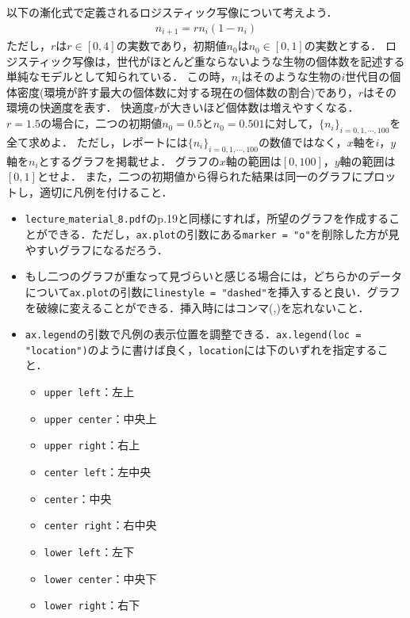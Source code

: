 \documentclass[a4paper,12pt]{jsarticle}
\begin{document}
以下の漸化式で定義されるロジスティック写像について考えよう．
\begin{align}
\label{eq:logistic}
    n_{i+1}=rn_{i}(1-n_{i})    
\end{align}
ただし，$r$は$r\in[0,4]$の実数であり，初期値$n_{0}$は$n_{0}\in[0,1]$の実数とする．
ロジスティック写像は，世代がほとんど重ならないような生物の個体数を記述する単純なモデルとして知られている．
この時，$n_{i}$はそのような生物の$i$世代目の個体密度(環境が許す最大の個体数に対する現在の個体数の割合)であり，$r$はその環境の快適度を表す．
快適度$r$が大きいほど個体数は増えやすくなる．\\

$r=1.5$の場合に，二つの初期値$n_{0}=0.5$と$n_{0}=0.501$に対して，$\{n_{i}\}_{i=0,1,\cdots,100}$を全て求めよ．
ただし，レポートには$\{n_{i}\}_{i=0,1,\cdots,100}$の数値ではなく，$x$軸を$i$，$y$軸を$n_{i}$とするグラフを掲載せよ．
グラフの$x$軸の範囲は$[0,100]$，$y$軸の範囲は$[0,1]$とせよ．
また，二つの初期値から得られた結果は同一のグラフにプロットし，適切に凡例を付けること．
\\

\begin{itemize}
    \item \texttt{lecture$\_$material$\_$8.pdf}のp.19と同様にすれば，所望のグラフを作成することができる．ただし，\texttt{ax.plot}の引数にある\texttt{marker = "o"}を削除した方が見やすいグラフになるだろう．
    \item もし二つのグラフが重なって見づらいと感じる場合には，どちらかのデータについて\texttt{ax.plot}の引数に\texttt{linestyle = "dashed"}を挿入すると良い．グラフを破線に変えることができる．挿入時にはコンマ(,)を忘れないこと．
    \item \texttt{ax.legend}の引数で凡例の表示位置を調整できる．\texttt{ax.legend(loc = "location")}のように書けば良く，\texttt{location}には下のいずれを指定すること．
    \begin{itemize}
        \item \texttt{upper left}：左上
        \item \texttt{upper center}：中央上
        \item \texttt{upper right}：右上
        \item \texttt{center left}：左中央
        \item \texttt{center}：中央
        \item \texttt{center right}：右中央
        \item \texttt{lower left}：左下
        \item \texttt{lower center}：中央下
        \item \texttt{lower right}：右下
    \end{itemize}
\end{itemize}
\end{document}

